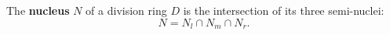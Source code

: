 The \textbf{nucleus} $N$ of a division ring $D$ is the intersection of its three semi-nuclei:
$$N = N_l \cap N_m \cap N_r.$$
